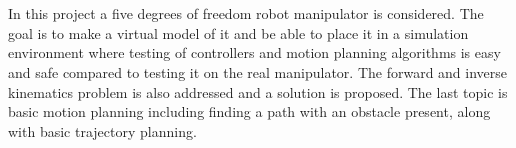 \chapter*{\englishabstractname}
In this project a five degrees of freedom robot manipulator is considered. The goal is to make a virtual model of it and be able to place it in a simulation environment where testing of controllers and motion planning algorithms is easy and safe compared to testing it on the real manipulator. The forward and inverse kinematics problem is also addressed and a solution is proposed. The last topic is basic motion planning including finding a path with an obstacle present, along with basic trajectory planning. 
\clearpage